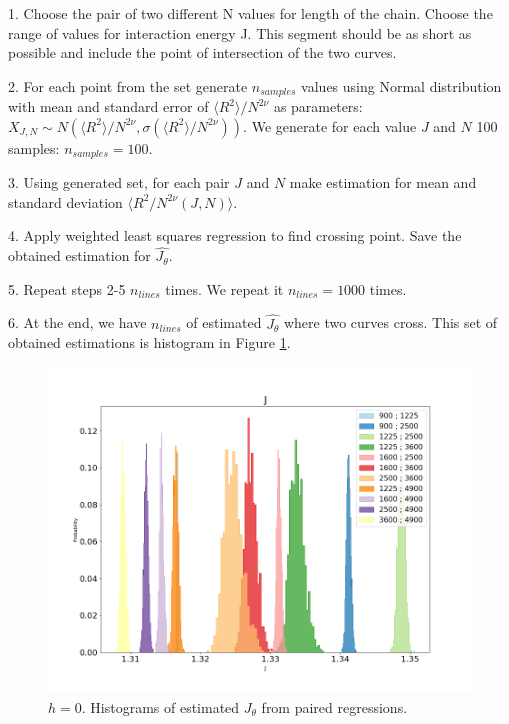 1. Choose the pair of two different N values for length of the chain. Choose the range of values for interaction energy J. This segment should be as short as possible and include the point of intersection of the two curves. 

2. For each point from the set generate $n_{samples}$ values using Normal distribution with mean and standard error of $\langle R^2 \rangle / N^ {2 \nu}$ as parameters: $ X_{J, N} \sim N (\langle R^2 \rangle / N^ {2 \nu}, \sigma (\langle R^2 \rangle / N^ {2 \nu}))$. We generate for each value $J$ and $N$ 100 samples: $n_{samples} = 100$. 

3. Using generated set, for each pair $J$ and $N$ make estimation for mean and standard deviation $\langle  R^2 / N^ {2 \nu} (J, N)\rangle$.

4. Apply weighted least squares regression to find crossing point. Save the obtained estimation for $\hat{J_{\theta}}$. 

5. Repeat steps 2-5 $n_{lines}$ times. We repeat it $n_{lines}=1000$ times. 

6. At the end, we have $n_{lines}$ of estimated $\hat{J_{\theta}}$ where two curves cross. This set of obtained estimations is histogram in Figure \ref{fig:Jthetahistogram}. 

 \begin{figure}
	\centering
	\includegraphics[scale=0.28]{Images/radius_hist_cov.png}
	\caption{$h=0$. Histograms of estimated $J_{\theta}$ from paired regressions.  }
	\label{fig:Jthetahistogram}
\end{figure}

